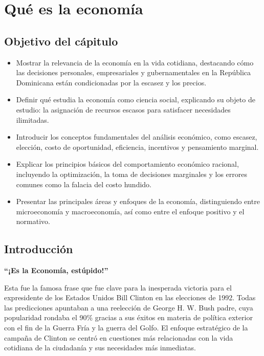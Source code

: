 \documentclass[
  letterpaper,
  DIV=11,
  numbers=noendperiod,
  oneside]{scrreprt}
\begin{document}
\chapter{Qué es la economía}\label{quuxe9-es-la-economuxeda}

\section{Objetivo del cápitulo}\label{objetivo-del-cuxe1pitulo}

\begin{itemize}
\item
  Mostrar la relevancia de la economía en la vida cotidiana, destacando
  cómo las decisiones personales, empresariales y gubernamentales en la
  República Dominicana están condicionadas por la escasez y los precios.
\item
  Definir qué estudia la economía como ciencia social, explicando su
  objeto de estudio: la asignación de recursos escasos para satisfacer
  necesidades ilimitadas.
\item
  Introducir los conceptos fundamentales del análisis económico, como
  escasez, elección, costo de oportunidad, eficiencia, incentivos y
  pensamiento marginal.
\item
  Explicar los principios básicos del comportamiento económico racional,
  incluyendo la optimización, la toma de decisiones marginales y los
  errores comunes como la falacia del costo hundido.
\item
  Presentar las principales áreas y enfoques de la economía,
  distinguiendo entre microeconomía y macroeconomía, así como entre el
  enfoque positivo y el normativo.
\end{itemize}

\section{Introducción}\label{introducciuxf3n}

\textbf{``¡Es la Economía, estúpido!''}

Esta fue la famosa frase que fue clave para la inesperada victoria para
el expresidente de los Estados Unidos Bill Clinton en las elecciones de
1992. Todas las predicciones apuntaban a una reelección de George H. W.
Bush padre, cuya popularidad rondaba el 90\% gracias a sus éxitos en
materia de política exterior con el fin de la Guerra Fría y la guerra
del Golfo. El enfoque estratégico de la campaña de Clinton se centró en
cuestiones más relacionadas con la vida cotidiana de la ciudadanía y sus
necesidades más inmediatas.
\end{document}
